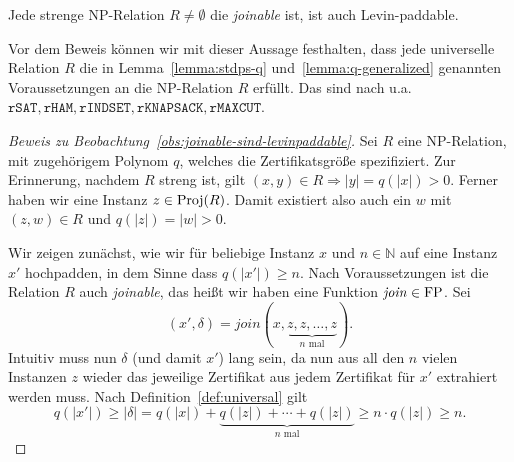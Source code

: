 \begin{observation}\label{obs:joinable-sind-levinpaddable}
    Jede strenge NP-Relation $R\neq\emptyset$ die \emph{joinable} ist, ist auch Levin-paddable.
\end{observation}
Vor dem Beweis können wir mit dieser Aussage festhalten, dass jede universelle Relation $R$ die in 
Lemma~\ref{lemma:stdps-q} und~\ref{lemma:q-generalized} genannten Voraussetzungen an die NP-Relation $R$ erfüllt.
Das sind nach \textcite{agrawal_universal_1992} u.a. $\mathtt{rSAT}, \mathtt{rHAM}, \mathtt{rINDSET}, \mathtt{rKNAPSACK}, \mathtt{rMAXCUT}$.
\medskip
\begin{proof}[Beweis zu Beobachtung~\ref{obs:joinable-sind-levinpaddable}]
    Sei $R$ eine NP-Relation, mit zugehörigem Polynom $q$, welches die Zertifikatsgröße spezifiziert. Zur Erinnerung, nachdem $R$ streng ist, gilt $(x,y)\in R \Rightarrow |y|=q(|x|)>0$.
    Ferner haben wir eine Instanz $z\in\operatorname{Proj}(R)$. Damit existiert also auch ein $w$ mit $(z,w)\in R$ und $q(|z|)=|w|>0$.

    Wir zeigen zunächst, wie wir für beliebige Instanz $x$ und $n\in\mathbb N$ auf eine Instanz $x'$ hochpadden, in dem Sinne dass $q(|x'|) \geq n$.
    Nach Voraussetzungen  ist die Relation $R$ auch \emph{joinable}, das heißt wir haben eine Funktion $\mathit{join}\in\mathrm{FP}$. Sei 
    \[ (x',\delta)=\mathit{join}(x, \underbrace{z, z, \ldots, z}_{\text{$n$ mal}}).\]
    Intuitiv muss nun $\delta$ (und damit $x'$) lang sein, da nun aus all den $n$ vielen Instanzen $z$ wieder das jeweilige Zertifikat aus jedem Zertifikat für $x'$ extrahiert werden muss.
    Nach Definition~\ref{def:universal} gilt
    \[ q(|x'|) \geq |\delta|=q(|x|) + \underbrace{q(|z|) + \cdots + q(|z|)}_{\text{$n$ mal}} \geq  n\cdot q(|z|) \geq n. \]


\end{proof}
